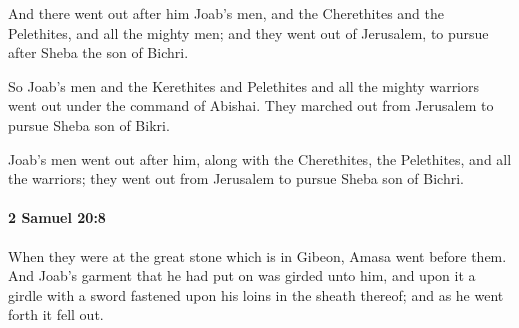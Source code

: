 			\begin{versebox}
					\item[BHS] 
					\item[ASV] And there went out after him Joab's men, and the Cherethites and the Pelethites, and all the mighty men; and they went out of Jerusalem, to pursue after Sheba the son of Bichri.
					\item[NIV] So Joab’s men and the Kerethites and Pelethites and all the mighty warriors went out under the command of Abishai. They marched out from Jerusalem to pursue Sheba son of Bikri.
					\item[NRSV] Joab’s men went out after him, along with the Cherethites, the Pelethites, and all the warriors; they went out from Jerusalem to pursue Sheba son of Bichri.
			\end{versebox}

		\paragraph{2 Samuel 20:8} %
			\label{2SAMUEL-20-8}

			When they were at the great stone which is in Gibeon, Amasa went before them. And Joab’s garment that he had put on was girded unto him, and upon it a girdle with a sword fastened upon his loins in the sheath thereof; and as he went forth it fell out.

